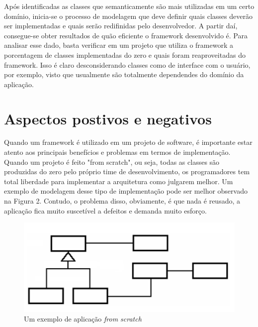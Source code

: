 \documentclass[
    12pt,       %
    openright,      %
    twoside,      %
    a4paper,      %
    english,      %
    french,       %
    spanish,      %
    brazil,       %
    ]{abntex2}
\begin{document}
          Após identificadas as classes que semanticamente são mais utilizadas em um
          certo domínio, inicia-se o processo de modelagem
          que deve definir quais classes deverão ser implementadas e quais serão
          redifinidas pelo desenvolvedor. A partir daí, consegue-se obter resultados
          de quão eficiente o framework desenvolvido é. Para analisar esse dado,
          basta verificar em um projeto que utiliza o framework a porcentagem
          de classes implementadas do zero e quais foram reaproveitadas do framework.
          Isso é claro desconsiderando classes como de interface com o usuário, por
          exemplo, visto que usualmente são totalmente dependendes do domínio da aplicação.

      \section{Aspectos postivos e negativos}
          Quando um framework é utilizado em um projeto de software, é importante estar
          atento aos principais benefícios e problemas em termos de implementação. Quando
          um projeto é feito "from scratch", ou seja, todas as classes são produzidas do
          zero pelo próprio time de desenvolvimento, os programadores tem total liberdade
          para implementar a arquitetura como julgarem melhor. Um exemplo de modelagem desse
          tipo de implementação pode ser melhor observado na Figura 2. Contudo, o problema
          disso, obviamente, é que nada é reusado, a aplicação fica muito suscetível a
          defeitos e demanda muito esforço.

          \begin{figure}[htbp]
              \begin{center}
                  \includegraphics[width=1.0\textwidth]{img/scratch.png}
              \end{center}
              \caption{\label{fig:passaro}Um exemplo de aplicação \textit{from scratch}}
          \end{figure}
\end{document}
